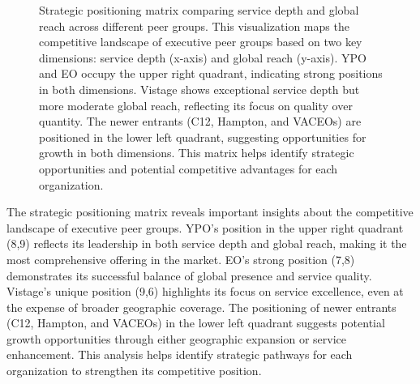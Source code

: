 \documentclass[conference]{IEEEtran}
\begin{document}
\begin{figure}[t]
\centering
{}
\caption{Strategic positioning matrix comparing service depth and global reach across different peer groups. This visualization maps the competitive landscape of executive peer groups based on two key dimensions: service depth (x-axis) and global reach (y-axis). YPO and EO occupy the upper right quadrant, indicating strong positions in both dimensions. Vistage shows exceptional service depth but more moderate global reach, reflecting its focus on quality over quantity. The newer entrants (C12, Hampton, and VACEOs) are positioned in the lower left quadrant, suggesting opportunities for growth in both dimensions. This matrix helps identify strategic opportunities and potential competitive advantages for each organization.}
\label{fig:positioning_matrix}
\end{figure}

The strategic positioning matrix reveals important insights about the competitive landscape of executive peer groups. YPO's position in the upper right quadrant (8,9) reflects its leadership in both service depth and global reach, making it the most comprehensive offering in the market. EO's strong position (7,8) demonstrates its successful balance of global presence and service quality. Vistage's unique position (9,6) highlights its focus on service excellence, even at the expense of broader geographic coverage. The positioning of newer entrants (C12, Hampton, and VACEOs) in the lower left quadrant suggests potential growth opportunities through either geographic expansion or service enhancement. This analysis helps identify strategic pathways for each organization to strengthen its competitive position.
\end{document}

